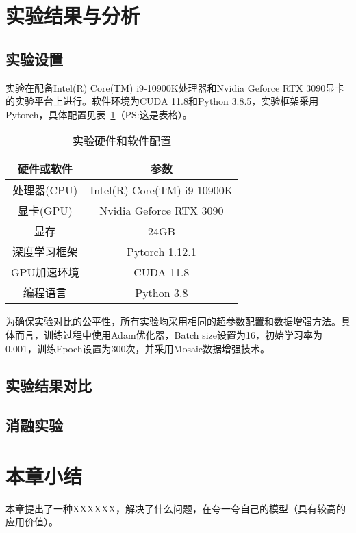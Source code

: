 \section{实验结果与分析}

\subsection{实验设置}
实验在配备Intel(R) Core(TM) i9-10900K处理器和Nvidia Geforce RTX 3090显卡的实验平台上进行。软件环境为CUDA 11.8和Python 3.8.5，实验框架采用Pytorch，具体配置见表~\ref{system_config_table}（PS:这是表格）。

\begin{table}[!htbp]
  \centering
  \caption{\hspace{-1em}实验硬件和软件配置}
  \label{system_config_table}
  \vspace{0.5em}
  \fontsize{10}{12}\selectfont
  \begin{tabular}{cc}
    \toprule
    \textbf{硬件或软件} & \textbf{参数} \\
    \midrule
    处理器(CPU) & Intel(R) Core(TM) i9-10900K \\
    显卡(GPU) & Nvidia Geforce RTX 3090 \\
    显存 & 24GB \\
    深度学习框架 & Pytorch 1.12.1 \\
    GPU加速环境 & CUDA 11.8 \\
    编程语言 & Python 3.8 \\
    \bottomrule
  \end{tabular}
\end{table}

为确保实验对比的公平性，所有实验均采用相同的超参数配置和数据增强方法。具体而言，训练过程中使用Adam优化器，Batch size设置为16，初始学习率为0.001，训练Epoch设置为300次，并采用Mosaic数据增强技术。


\subsection{实验结果对比}



\subsection{消融实验}



\section{本章小结}


本章提出了一种XXXXXX，解决了什么问题，在夸一夸自己的模型（具有较高的应用价值）。